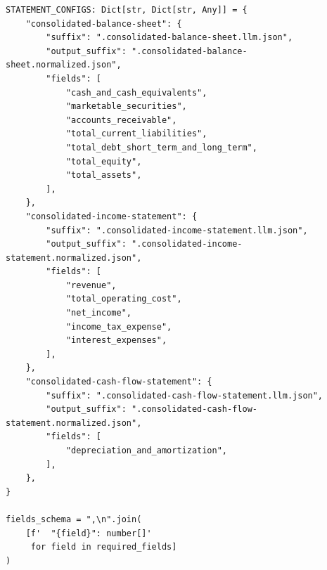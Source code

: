 \documentclass[12pt,a4paper]{article}
\begin{document}
\begin{lstlisting}[style=python, caption={Step~5 prompt (original): extracting normalized financial fields as JSON}, label=lst:prompt_step5_original]
STATEMENT_CONFIGS: Dict[str, Dict[str, Any]] = {
    "consolidated-balance-sheet": {
        "suffix": ".consolidated-balance-sheet.llm.json",
        "output_suffix": ".consolidated-balance-sheet.normalized.json",
        "fields": [
            "cash_and_cash_equivalents",
            "marketable_securities",
            "accounts_receivable",
            "total_current_liabilities",
            "total_debt_short_term_and_long_term",
            "total_equity",
            "total_assets",
        ],
    },
    "consolidated-income-statement": {
        "suffix": ".consolidated-income-statement.llm.json",
        "output_suffix": ".consolidated-income-statement.normalized.json",
        "fields": [
            "revenue",
            "total_operating_cost",
            "net_income",
            "income_tax_expense",
            "interest_expenses",
        ],
    },
    "consolidated-cash-flow-statement": {
        "suffix": ".consolidated-cash-flow-statement.llm.json",
        "output_suffix": ".consolidated-cash-flow-statement.normalized.json",
        "fields": [
            "depreciation_and_amortization",
        ],
    },
}

fields_schema = ",\n".join(
    [f'  "{field}": number[]'
     for field in required_fields]
)


\end{lstlisting}
\end{document}
